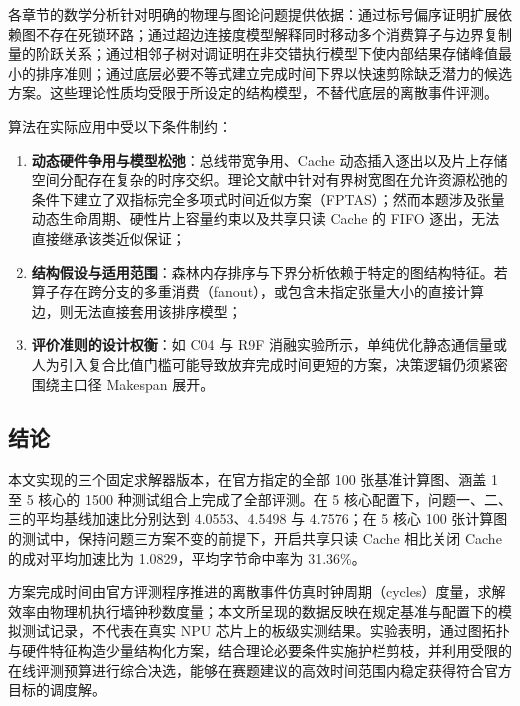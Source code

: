 \documentclass[anonymous,notoc]{gmcm2026}
\providecommand{\tightlist}{\setlength{\itemsep}{0pt}\setlength{\parskip}{0pt}}
\begin{document}
各章节的数学分析针对明确的物理与图论问题提供依据：通过标号偏序证明扩展依赖图不存在死锁环路；通过超边连接度模型解释同时移动多个消费算子与边界复制量的阶跃关系；通过相邻子树对调证明在非交错执行模型下使内部结果存储峰值最小的排序准则；通过底层必要不等式建立完成时间下界以快速剪除缺乏潜力的候选方案。这些理论性质均受限于所设定的结构模型，不替代底层的离散事件评测。

算法在实际应用中受以下条件制约：

\begin{enumerate}
\def\labelenumi{\arabic{enumi}.}
\tightlist
\item
  \textbf{动态硬件争用与模型松弛}：总线带宽争用、Cache 动态插入逐出以及片上存储空间分配存在复杂的时序交织。理论文献中针对有界树宽图在允许资源松弛的条件下建立了双指标完全多项式时间近似方案（FPTAS）\cite{ref11}；然而本题涉及张量动态生命周期、硬性片上容量约束以及共享只读 Cache 的 FIFO 逐出，无法直接继承该类近似保证；
\item
  \textbf{结构假设与适用范围}：森林内存排序与下界分析依赖于特定的图结构特征。若算子存在跨分支的多重消费（fanout），或包含未指定张量大小的直接计算边，则无法直接套用该排序模型；
\item
  \textbf{评价准则的设计权衡}：如 C04 与 R9F 消融实验所示，单纯优化静态通信量或人为引入复合比值门槛可能导致放弃完成时间更短的方案，决策逻辑仍须紧密围绕主口径 Makespan 展开。
\end{enumerate}

\subsection{结论}

本文实现的三个固定求解器版本，在官方指定的全部 100 张基准计算图、涵盖 1 至 5 核心的 1500 种测试组合上完成了全部评测。在 5 核心配置下，问题一、二、三的平均基线加速比分别达到 4.0553、4.5498 与 4.7576；在 5 核心 100 张计算图的测试中，保持问题三方案不变的前提下，开启共享只读 Cache 相比关闭 Cache 的成对平均加速比为 1.0829，平均字节命中率为 31.36\%。

方案完成时间由官方评测程序推进的离散事件仿真时钟周期（cycles）度量，求解效率由物理机执行墙钟秒数度量；本文所呈现的数据反映在规定基准与配置下的模拟测试记录，不代表在真实 NPU 芯片上的板级实测结果。实验表明，通过图拓扑与硬件特征构造少量结构化方案，结合理论必要条件实施护栏剪枝，并利用受限的在线评测预算进行综合决选，能够在赛题建议的高效时间范围内稳定获得符合官方目标的调度解。
\end{document}
